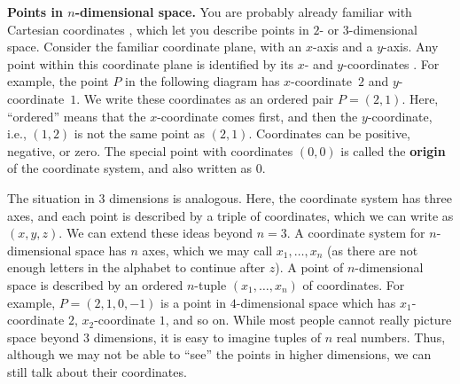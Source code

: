 \noindent\textbf{Points in $n$-dimensional space.}
You are probably already familiar with Cartesian coordinates%
%
, which let you describe
points in $2$- or $3$-dimensional space. Consider the
familiar coordinate plane, with an $x$-axis and a $y$-axis. Any point
within this coordinate plane is identified by its $x$- and
$y$-coordinates%
. For example, the point $P$ in the
following diagram has $x$-coordinate~$2$ and $y$-coordinate~$1$.  We
write these coordinates as an ordered pair $P=(2,1)$. Here,
``ordered'' means that the $x$-coordinate comes first, and then the
$y$-coordinate, i.e., $(1,2)$ is not the same point as
$(2,1)$. Coordinates can be positive, negative, or zero. The special
point with coordinates $(0,0)$ is called the
\textbf{origin} of the coordinate
system, and also written as $0$.
\begin{center}
\end{center}
The situation in $3$ dimensions is analogous. Here, the coordinate
system has three axes, and each point is described by a triple of
coordinates, which we can write as $(x,y,z)$.  We can extend these
ideas beyond $n=3$. A coordinate system for $n$-dimensional space has
$n$ axes, which we may call $x_1,\ldots,x_n$ (as there are not enough
letters in the alphabet to continue after $z$). A point of
$n$-dimensional space is described by an ordered $n$-tuple
$(x_1,\ldots,x_n)$ of coordinates. For example, $P=(2,1,0,-1)$ is a
point in $4$-dimensional space which has $x_1$-coordinate $2$,
$x_2$-coordinate $1$, and so on. While most people cannot really
picture space beyond $3$ dimensions, it is easy to imagine tuples of
$n$ real numbers. Thus, although we may not be able to ``see'' the
points in higher dimensions, we can still talk about their coordinates.
\bigskip

